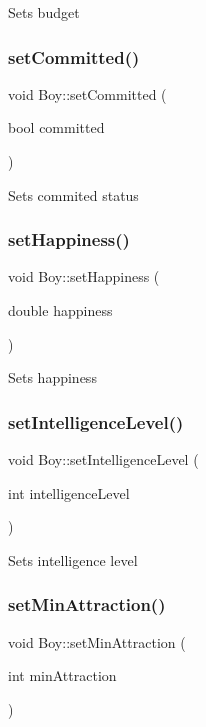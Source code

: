 Sets budget \mbox{\label{class_boy_a6af3e7642f17781764a7aae58568d5c7}} 
\subsubsection{\texorpdfstring{set\+Committed()}{setCommitted()}}
{\footnotesize\ttfamily void Boy\+::set\+Committed (\begin{DoxyParamCaption}\item[{bool}]{committed }\end{DoxyParamCaption})}

Sets commited status \mbox{\label{class_boy_a4de551a1a85cd44f8955ef3eea50eb0e}} 
\subsubsection{\texorpdfstring{set\+Happiness()}{setHappiness()}}
{\footnotesize\ttfamily void Boy\+::set\+Happiness (\begin{DoxyParamCaption}\item[{double}]{happiness }\end{DoxyParamCaption})}

Sets happiness \mbox{\label{class_boy_ad1eea5f50af9763a810bff01bb0a80e2}} 
\subsubsection{\texorpdfstring{set\+Intelligence\+Level()}{setIntelligenceLevel()}}
{\footnotesize\ttfamily void Boy\+::set\+Intelligence\+Level (\begin{DoxyParamCaption}\item[{int}]{intelligence\+Level }\end{DoxyParamCaption})}

Sets intelligence level \mbox{\label{class_boy_a9e39b3cb4cbc2c0827a34410d9f826fc}} 
\subsubsection{\texorpdfstring{set\+Min\+Attraction()}{setMinAttraction()}}
{\footnotesize\ttfamily void Boy\+::set\+Min\+Attraction (\begin{DoxyParamCaption}\item[{int}]{min\+Attraction }\end{DoxyParamCaption})}

